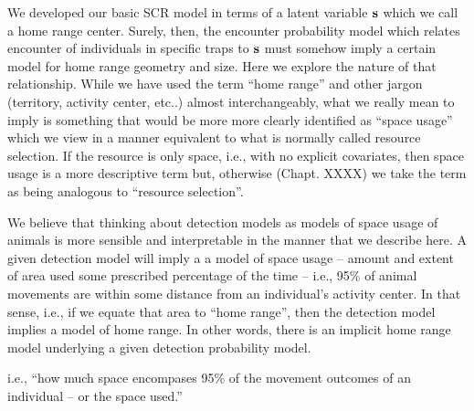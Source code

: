 We developed our basic SCR model in terms of a latent variable ${\bf
  s}$ which we call a home range center.  Surely, then, the encounter
probability model which relates encounter of individuals in specific
traps to ${\bf s}$ must somehow imply a certain model for home range
geometry and size.  Here we explore the nature of that relationship.  While we
have used the term ``home range'' and other jargon (territory,
activity center, etc..) almost interchangeably, what we really mean to
imply is something that would be more more clearly identified as
``space usage'' which we view in a manner equivalent to what is
normally called resource selection. If the resource is only space,
i.e., with no explicit covariates, then space usage is a more
descriptive term but, otherwise (Chapt. XXXX) we take the term as
being analogous to ``resource selection''.

We believe that thinking about detection models as models of
space usage of animals is more sensible and interpretable in the manner
that we describe here.  A given detection model will imply a a model
of space usage -- amount and extent of area used some prescribed
percentage of the time -- i.e., 95\% of animal movements are within
some distance from an individual's activity center. 
In that sense, i.e., if we equate that area to ``home
range'', then the detection model implies a model of home range. In
other words, there is an implicit home range model underlying a given
detection probability model. 

i.e., ``how much space encompases 95\% of the movement outcomes of an
individual -- or the space used.''

